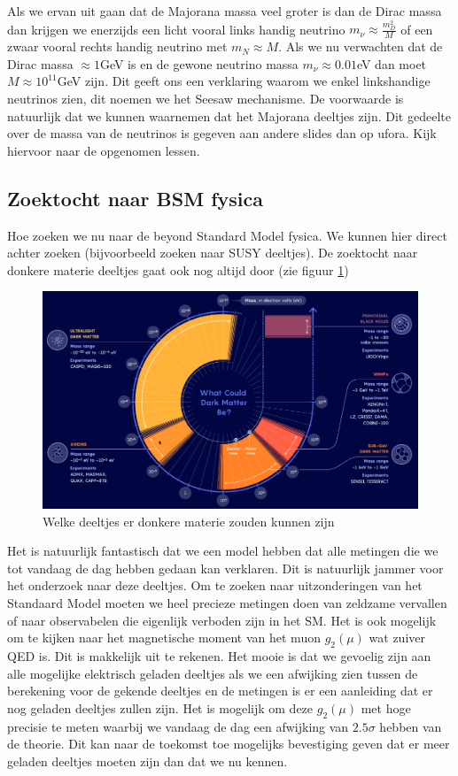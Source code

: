 \documentclass[../main.tex]{subfiles}
\begin{document}
Als we ervan uit gaan dat de Majorana massa veel groter is dan de Dirac massa dan krijgen we enerzijds een licht vooral links handig neutrino $m_{\nu} \approx \frac{m_{D}^{2}}{M}$ of een zwaar vooral rechts handig neutrino met $m_{N} \approx M$. Als we nu verwachten dat de Dirac massa $\approx 1$GeV is en de gewone neutrino massa $m_\nu\approx 0.01$eV dan moet $M\approx 10^11$GeV zijn. Dit geeft ons een verklaring waarom we enkel linkshandige neutrinos zien, dit noemen we het Seesaw mechanisme. De voorwaarde is natuurlijk dat we kunnen waarnemen dat het Majorana deeltjes zijn. {\color{green} Dit gedeelte over de massa van de neutrinos is gegeven aan andere slides dan op ufora. Kijk hiervoor naar de opgenomen lessen.}

\subsection{Zoektocht naar BSM fysica}%
\label{sub:zoektocht_naar_bsm_fysica}

Hoe zoeken we nu naar de beyond Standard Model fysica. We kunnen hier direct achter zoeken (bijvoorbeeld zoeken naar SUSY deeltjes). De zoektocht naar donkere materie deeltjes gaat ook nog altijd door (zie figuur \ref{fig:physics_beyond_the_standard_model/donkere_materie_mogelijkheden})

\begin{figure}[h]
    \centering
    \includegraphics[width=0.5\linewidth]{physics_beyond_the_standard_model/donkere_materie_mogelijkheden.png}
    \caption{Welke deeltjes er donkere materie zouden kunnen zijn}%
    \label{fig:physics_beyond_the_standard_model/donkere_materie_mogelijkheden}
\end{figure}

Het is natuurlijk fantastisch dat we een model hebben dat alle metingen die we tot vandaag de dag hebben gedaan kan verklaren. Dit is natuurlijk jammer voor het onderzoek naar deze deeltjes. Om te zoeken naar uitzonderingen van het Standaard Model moeten we heel precieze metingen doen van zeldzame vervallen of naar observabelen die eigenlijk verboden zijn in het SM. Het is ook mogelijk om te kijken naar het magnetische moment van het muon $g_2(\mu)$ wat zuiver QED is. Dit is makkelijk uit te rekenen. Het mooie is dat we gevoelig zijn aan alle mogelijke elektrisch geladen deeltjes als we een afwijking zien tussen de berekening voor de gekende deeltjes en de metingen is er een aanleiding dat er nog geladen deeltjes zullen zijn. Het is mogelijk om deze $g_2(\mu)$ met hoge precisie te meten waarbij we vandaag de dag een afwijking van $2.5\sigma$ hebben van de theorie. Dit kan naar de toekomst toe mogelijks bevestiging geven dat er meer geladen deeltjes moeten zijn dan dat we nu kennen.
\end{document}
